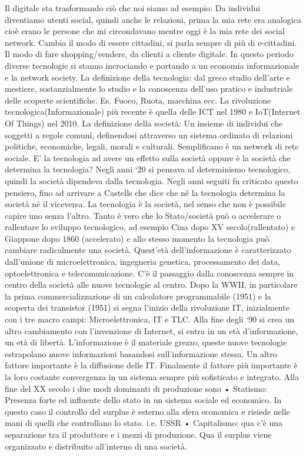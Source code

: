 \documentclass[11pt, a4page, twocolumn]{article}
\begin{document}


Il digitale sta trasformando ciò che noi siamo ad esempio: Da individui diventiamo utenti social, quindi anche le relazioni, prima la mia rete era analogica cioè erano le persone che mi circondavano mentre oggi è la mia rete dei social network. Cambia il modo di essere cittadini, si parla sempre di più di e-cittadini. Il modo di fare shopping/vendere, da clienti a cliente digitale. In questo periodo diverse tecnologie si stanno incrociando e portando a un economia informazionale e la network society.
La definizione della tecnologia: dal greco studio dell’arte e mestiere, sostanzialmente lo studio e la conoscenza dell’uso pratico e industriale delle scoperte scientifiche. Es. Fuoco, Ruota, macchina ecc. La rivoluzione tecnologica(Informazionale) più recente è quella delle ICT nel 1980 e IoT(Internet Of Things) nel 2010.
La definizione della società: Un insieme di individui che soggetti a regole comuni, definendosi attraverso un sistema ordinato di relazioni politiche, economiche, legali, morali e culturali. Semplificano è un network di rete sociale.
E’ la tecnologia ad avere un effetto sulla società oppure è la società che determina la tecnologia? Negli anni ‘20 si pensava al determinismo tecnologico, quindi la società dipendeva dalla tecnologia. Negli anni seguiti fu criticato questo pensiero, fino ad arrivare a Castells che dice che né la tecnologia determina la società né il viceversa. La tecnologia è la società, nel senso che non è possibile capire uno senza l’altro. Tanto è vero che lo Stato/società può o accelerare o rallentare lo sviluppo tecnologico, ad esempio Cina dopo XV secolo(rallentato) e Giappone dopo 1860 (accelerato) e allo stesso momento la tecnologia può cambiare radicalmente una società.
Quest’età dell’informazione è caratterizzato dall’unione di microelettronica, ingegneria genetica, processamento dei data, optoelettronica e telecomunicazione. C’è il passaggio dalla conoscenza sempre in centro della società alle nuove tecnologie al centro. Dopo la WWII, in particolare la prima commercializzazione di un calcolatore programmabile (1951) e la scoperta dei transistor (1951) si segna l’inizio della rivoluzione IT, inizialmente con i tre macro campi: Microelettronica, IT e TLC. Alla fine degli ‘90 si crea un altro cambiamento con l’invenzione di Internet, si entra in un età d’informazione, un età di libertà. 
L’informazione è il materiale grezzo, queste nuove tecnologie estrapolano nuove informazioni basandosi sull’informazione stessa. Un altro fattore importante è la diffusione delle IT. Finalmente il fattore più importante è la loro costante convergenza in un sistema sempre più sofisticato e integrato. 
Alla fine del XX secolo i due modi dominanti di produzione sono
    • Statismo: Presenza forte ed influente dello stato in un sistema sociale ed economico. In questo caso il controllo del surplus è esterno alla sfera economica e risiede nelle mani di quelli che controllano lo stato. i.e. USSR
    • Capitalismo: qua c’è una separazione tra il produttore e i mezzi di produzione. Qua il surplus viene organizzato e distribuito all’interno di una società.
\end{document}
